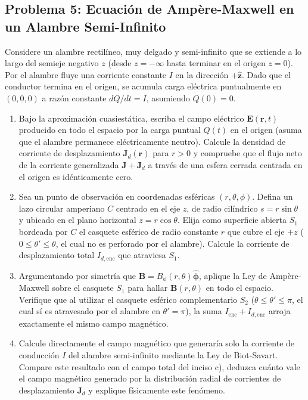 \documentclass[11pt]{article}
\begin{document}
\subsection*{Problema 5: Ecuación de Ampère-Maxwell en un Alambre Semi-Infinito}
Considere un alambre rectilíneo, muy delgado y semi-infinito que se extiende a lo largo del semieje negativo $z$ (desde $z = -\infty$ hasta terminar en el origen $z = 0$). Por el alambre fluye una corriente constante $I$ en la dirección $+\hat{\mathbf{z}}$. Dado que el conductor termina en el origen, se acumula carga eléctrica puntualmente en $(0,0,0)$ a razón constante $dQ/dt = I$, asumiendo $Q(0) = 0$.
\begin{enumerate}
    \item[a)] Bajo la aproximación cuasiestática, escriba el campo eléctrico $\mathbf{E}(\mathbf{r}, t)$ producido en todo el espacio por la carga puntual $Q(t)$ en el origen (asuma que el alambre permanece eléctricamente neutro). Calcule la densidad de corriente de desplazamiento $\mathbf{J}_d(\mathbf{r})$ para $r > 0$ y compruebe que el flujo neto de la corriente generalizada $\mathbf{J} + \mathbf{J}_d$ a través de una esfera cerrada centrada en el origen es idénticamente cero.
    \item[b)] Sea un punto de observación en coordenadas esféricas $(r, \theta, \phi)$. Defina un lazo circular amperiano $C$ centrado en el eje $z$, de radio cilíndrico $s = r\sin\theta$ y ubicado en el plano horizontal $z = r\cos\theta$. Elija como superficie abierta $S_1$ bordeada por $C$ el casquete esférico de radio constante $r$ que cubre el eje $+z$ ($0 \le \theta' \le \theta$, el cual no es perforado por el alambre). Calcule la corriente de desplazamiento total $I_{d,\text{enc}}$ que atraviesa $S_1$.
    \item[c)] Argumentando por simetría que $\mathbf{B} = B_\phi(r, \theta) \hat{\boldsymbol{\phi}}$, aplique la Ley de Ampère-Maxwell sobre el casquete $S_1$ para hallar $\mathbf{B}(r, \theta)$ en todo el espacio. Verifique que al utilizar el casquete esférico complementario $S_2$ ($\theta \le \theta' \le \pi$, el cual sí es atravesado por el alambre en $\theta' = \pi$), la suma $I_{\text{enc}} + I_{d,\text{enc}}$ arroja exactamente el mismo campo magnético.
    \item[d)] Calcule directamente el campo magnético que generaría solo la corriente de conducción $I$ del alambre semi-infinito mediante la Ley de Biot-Savart. Compare este resultado con el campo total del inciso c), deduzca cuánto vale el campo magnético generado por la distribución radial de corrientes de desplazamiento $\mathbf{J}_d$ y explique físicamente este fenómeno.
\end{enumerate}
\end{document}
